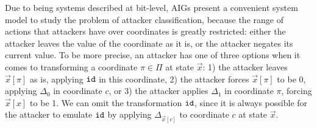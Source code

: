 Due to being systems described at bit-level, AIGs present a convenient system model to study the problem of attacker classification, because the range of actions that attackers have over coordinates is greatly restricted: either the attacker leaves the value of the coordinate as it is, or the attacker negates its current value. To be more precise, an attacker has one of three options when it comes to transforming a coordinate $\pi\in \Pi$ at state $\vec{x}$: 1) the attacker leaves $\vec{x}[\pi]$ as is, applying ${\texttt{id}}$ in this coordinate, 2) the attacker forces $\vec{x}[\pi]$ to be 0, applying $\Delta_0$ in coordinate $c$, or 3) the attacker applies $\Delta_1$ in coordinate $\pi$, forcing $\vec{x}[x]$ to be 1. We can omit the transformation ${\texttt{id}}$, since it is always possible for the attacker to emulate ${\texttt{id}}$ by applying $\Delta_{\vec{x}[c]}$ to coordinate $c$ at state $\vec{x}$.




